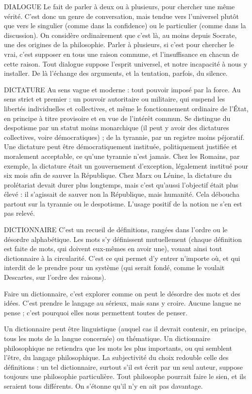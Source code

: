 DIALOGUE Le fait de parler à deux ou à plusieurs, pour chercher une même
vérité. C’est donc un genre de conversation, mais tendue vers
l'universel plutôt que vers le singulier (comme dans la confidence) ou le particulier
(comme dans la discussion). On considère ordinairement que c’est là, au
moins depuis Socrate, une des origines de la philosophie. Parler à plusieurs, si
c’est pour chercher le vrai, c’est supposer en tous une raison commune, et
l'insuffisance en chacun de cette raison. Tout dialogue suppose l'esprit universel,
et notre incapacité à nous y installer. De là l’échange des arguments, et
la tentation, parfois, du silence.

DICTATURE Au sens vague et moderne : tout pouvoir imposé par la force.
Au sens strict et premier : un pouvoir autoritaire ou militaire,
qui suspend les libertés individuelles et collectives, et même le fonctionnement
ordinaire de l’État, en principe à titre provisoire et en vue de l'intérêt commun.
Se distingue du despotisme par un statut moins monarchique (il peut y avoir
des dictatures collectives, voire démocratiques) ; de la tyrannie, par un registre
moins péjoratif. Une dictature peut être démocratiquement instituée, politiquement
justifiée et moralement acceptable, ce qu’une tyrannie n’est jamais.
Chez les Romains, par exemple, la dictature était un gouvernement d’exception,
légalement institué pour six mois afin de sauver la République. Chez
Marx ou Lénine, la dictature du prolétariat devait durer plus longtemps, mais
c'est qu'aussi l’objectif était plus élevé : il s'agissait de sauver non la République,
mais humanité. Cela déboucha partout sur la tyrannie ou le despotisme.
L’usage positif de la notion ne s’en est pas relevé.

DICTIONNAIRE C'est un recueil de définitions, rangées dans l’ordre ou le
désordre alphabétique. Les mots s’y définissent mutuellement
(chaque définition est faite de mots, qui doivent eux-mêmes en avoir
une), vouant ainsi tout dictionnaire à la circularité. C’est ce qui permet d’y
entrer n'importe où, et qui interdit de le prendre pour un système (qui serait
fondé, comme le voulait Descartes, sur l’ordre des raisons).

Faire un dictionnaire, c’est explorer comme on peut le désordre des mots et
des idées. C’est prendre le langage au sérieux, mais sans y croire. Aucune langue
ne pense ; c’est pourquoi elles nous permettent toutes de penser.

Un dictionnaire peut être linguistique (auquel cas il devrait contenir, en
principe, tous les mots de la langue concernée) ou thématique. Un dictionnaire
philosophique ne retiendra que les mots les plus importants, ou qui semblent
l'être, du langage philosophique. La subjectivité du choix redouble celle des
définitions : un tel dictionnaire, surtout s’il est écrit par un seul auteur, suppose
toujours une philosophie particulière. Tout philosophe pourrait faire le sien, et
ils seraient tous différents. On s'étonne qu’il n’y en ait pas davantage.

